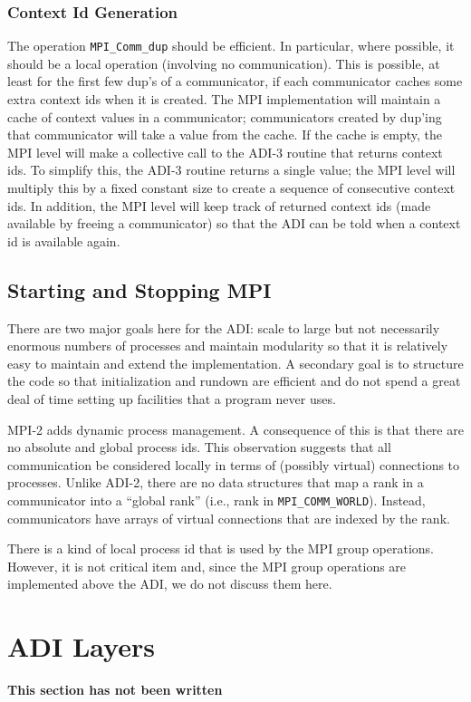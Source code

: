 \documentclass{article}
\def\code#1{\texttt{#1}}
\begin{document}
\subsubsection{Context Id Generation}
\label{sec:context-id-generation}
The operation \code{MPI_Comm_dup} should be efficient.  In particular,
where possible, it should be a local operation (involving no
communication).  This is possible, at least for the first few dup's of
a communicator, if each communicator caches some extra context ids
when it is created.  The MPI implementation will maintain a cache of
context values in a communicator; communicators created by dup'ing
that communicator will take a value from the cache.  If the cache is
empty, the MPI level will make a collective call to the ADI-3 routine
that returns context ids.  To simplify this, the ADI-3 routine returns
a single value; the MPI level will multiply this by a fixed constant
size to create a sequence of consecutive context ids.  In addition,
the MPI level will keep track of returned context ids (made available
by freeing a communicator) so that the ADI can be told when a context
id is available again.

\subsection{Starting and Stopping MPI}
There are two major goals here for the ADI:  scale to large but not
necessarily enormous numbers of processes and maintain modularity so
that it is relatively easy to maintain and extend the implementation.
A secondary goal is to structure the code so that initialization and
rundown are efficient and do not spend a great deal of time setting up
facilities that a program never uses.

MPI-2 adds dynamic process management.  A consequence of this is that
there are no absolute and global process ids.  This observation
suggests that all communication be considered locally in terms of
(possibly virtual) connections to processes.  Unlike ADI-2, there are
no data structures that map a rank in a communicator into a ``global
rank'' (i.e., rank in \code{MPI_COMM_WORLD}).  Instead, communicators
have arrays of virtual connections that are indexed by the rank.

There is a kind of local process id that is used by the MPI group
operations.  However, it is not critical item and, since the MPI group
operations are implemented above the ADI, we do not discuss them here.

\section{ADI Layers}
\label{sec:layers}
\textbf{This section has not been written}
\end{document}
